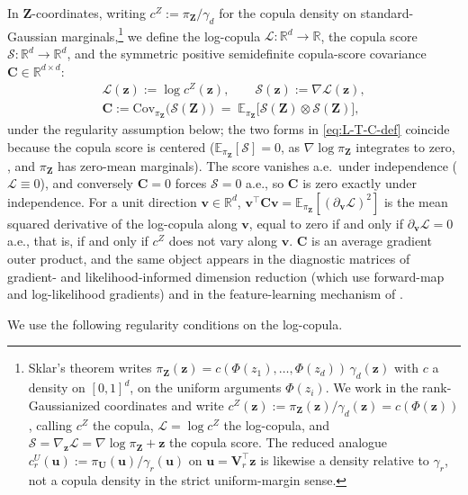 \documentclass[review,hidelinks,onefignum,onetabnum]{siamart251216}
\newcommand{\RR}{\mathbb{R}}
\newcommand{\EE}{\mathbb{E}}
\newcommand{\Cov}{\mathrm{Cov}}
\newcommand{\gauss}{\gamma}
\newcommand{\mC}{\bm{C}}
\newcommand{\mV}{\bm{V}}
\newcommand{\vz}{\bm{z}}
\newcommand{\vZ}{\bm{Z}}
\newcommand{\vu}{\bm{u}}
\newcommand{\vU}{\bm{U}}
\newcommand{\vv}{\bm{v}}
\newcommand{\scL}{\mathcal{L}}
\newcommand{\scS}{\mathcal{S}}
\begin{document}
In $\vZ$-coordinates, writing $c^{Z} := \pi_{\vZ}/\gauss_d$ for the copula density on standard-Gaussian marginals,\footnote{Sklar's theorem writes $\pi_{\vZ}(\vz) = c(\Phi(z_1),\dots,\Phi(z_d))\,\gauss_d(\vz)$ with $c$ a density on $[0,1]^d$, on the uniform arguments $\Phi(z_i)$. We work in the rank-Gaussianized coordinates and write $c^{Z}(\vz) := \pi_{\vZ}(\vz)/\gauss_d(\vz) = c(\Phi(\vz))$, calling $c^{Z}$ the copula, $\scL = \log c^{Z}$ the log-copula, and $\scS = \nabla_{\vz}\scL = \nabla\log\pi_{\vZ} + \vz$ the copula score. The reduced analogue $c^{U}_r(\vu) := \pi_{\vU}(\vu)/\gauss_r(\vu)$ on $\vu = \mV_r^\top\vz$ is likewise a density relative to $\gauss_r$, not a copula density in the strict uniform-margin sense.} we define the log-copula $\scL: \RR^d\to\RR$, the copula score $\scS: \RR^d\to\RR^d$, and the symmetric positive semidefinite copula-score covariance $\mC\in\RR^{d\times d}$:
\begin{equation}
\begin{gathered}
  \scL(\vz) := \log c^{Z}(\vz),\qquad
  \scS(\vz) := \nabla \scL(\vz),\\[2pt]
  \mC := \Cov_{\pi_{\vZ}}\!\bigl(\scS(\vZ)\bigr) \;=\; \EE_{\pi_{\vZ}}\bigl[\scS(\vZ)\otimes\scS(\vZ)\bigr],
\end{gathered}
  \label{eq:L-T-C-def}
\end{equation}
under the regularity assumption below; the two forms in \eqref{eq:L-T-C-def} coincide because the copula score is centered ($\EE_{\pi_{\vZ}}[\scS] = 0$, as $\nabla\log\pi_{\vZ}$ integrates to zero, , and $\pi_{\vZ}$ has zero-mean marginals). The score vanishes a.e.\ under independence ($\scL\equiv 0$), and conversely $\mC = 0$ forces $\scS = 0$ a.e., so $\mC$ is zero exactly under independence. For a unit direction $\vv\in\RR^d$, $\vv^\top\mC\vv = \EE_{\pi_{\vZ}}[(\partial_{\vv}\scL)^2]$ is the mean squared derivative of the log-copula along $\vv$, equal to zero if and only if $\partial_{\vv}\scL = 0$ a.e., that is, if and only if $c^{Z}$ does not vary along $\vv$. $\mC$ is an average gradient outer product, and the same object appears in the diagnostic matrices of gradient- and likelihood-informed dimension reduction \cite{ZahmConstantinePrieurMarzouk2020, BigoniMarzoukPrieurZahm2022, ChenArnaudBaptistaZahm2024} (which use forward-map and log-likelihood gradients) and in the feature-learning mechanism of \cite{RadhakrishnanBeagleholePanditBelkin2024}.

We use the following regularity conditions on the log-copula.
\end{document}
